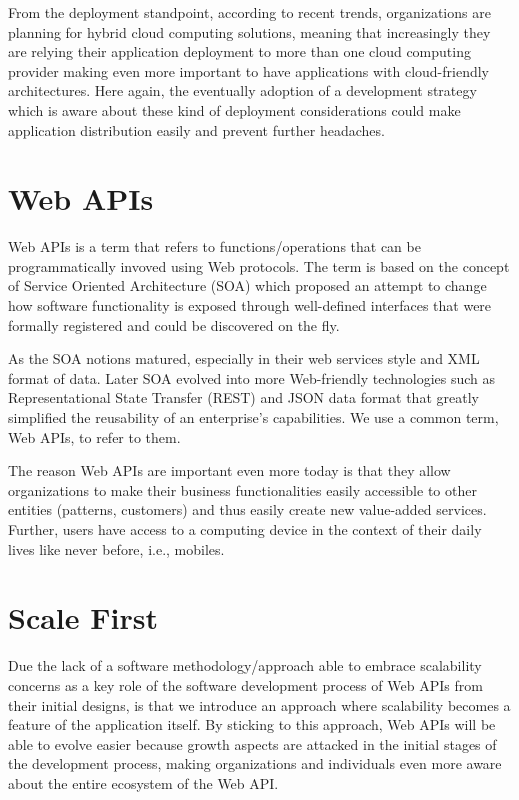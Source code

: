 \documentclass[10pt,article]{IEEEtran}
\begin{document}
From the deployment standpoint, according to recent trends, organizations are planning for hybrid cloud computing solutions, meaning that increasingly they are relying their application deployment to more than one cloud computing provider\cite{rightscale} making even more important to have applications with cloud-friendly architectures. Here again, the eventually adoption of a development strategy which is aware about these kind of deployment considerations could make application distribution easily and prevent further headaches.
 

\section{Web APIs}
Web APIs is a term that refers to functions/operations that can be programmatically invoved using Web protocols. The term is based on the concept of Service Oriented Architecture (SOA) which proposed an attempt to change how software functionality is exposed through well-defined interfaces that were formally registered and could be discovered on the fly.

As the SOA notions matured, especially in their web services style and XML format of data. Later SOA evolved into more Web-friendly technologies such as Representational State Transfer (REST) and JSON data format that greatly simplified the reusability of an enterprise's capabilities. We use a common term, Web APIs, to refer to them.

The reason Web APIs are important even more today is that they allow organizations to make their business functionalities easily accessible  to  other  entities  (patterns,  customers)  and  thus  easily create new value-added services. Further, users have access to a computing  device  in  the  context  of  their  daily  lives  like  never before, i.e., mobiles.\cite{webapi:definition}

\section{Scale First}
Due the lack of a software methodology/approach able to embrace scalability concerns as a key role of the software development process of Web APIs from their initial designs, is that we introduce an approach where scalability becomes a feature of the application itself. By sticking to this approach, Web APIs will be able to evolve easier because growth aspects are attacked in the initial stages of the development process, making organizations and individuals even more aware about the entire ecosystem of the Web API.
\end{document}
